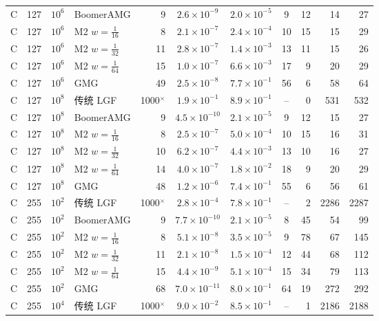 \begin{longtable}{lrrlrcccrrr}
C & 127 & $10^{6}$ & BoomerAMG & 9 & $2.6{\times}10^{-9}$ & $2.0{\times}10^{-5}$ & 9 & 12 & 14 & 27 \\
C & 127 & $10^{6}$ & M2 $w{=}\frac1{16}$ & 8 & $2.1{\times}10^{-7}$ & $2.4{\times}10^{-4}$ & 10 & 15 & 15 & 29 \\
C & 127 & $10^{6}$ & M2 $w{=}\frac1{32}$ & 11 & $2.8{\times}10^{-7}$ & $1.4{\times}10^{-3}$ & 13 & 11 & 15 & 26 \\
C & 127 & $10^{6}$ & M2 $w{=}\frac1{64}$ & 15 & $1.0{\times}10^{-7}$ & $6.6{\times}10^{-3}$ & 17 & 9 & 20 & 29 \\
C & 127 & $10^{6}$ & GMG & 49 & $2.5{\times}10^{-8}$ & $7.7{\times}10^{-1}$ & 56 & 6 & 58 & 64 \\
C & 127 & $10^{8}$ & 传统 LGF & 1000$^\times$ & $1.9{\times}10^{-1}$ & $8.9{\times}10^{-1}$ & -- & 0 & 531 & 532 \\
C & 127 & $10^{8}$ & BoomerAMG & 9 & $4.5{\times}10^{-10}$ & $2.1{\times}10^{-5}$ & 9 & 12 & 15 & 27 \\
C & 127 & $10^{8}$ & M2 $w{=}\frac1{16}$ & 8 & $2.5{\times}10^{-7}$ & $5.0{\times}10^{-4}$ & 10 & 15 & 16 & 31 \\
C & 127 & $10^{8}$ & M2 $w{=}\frac1{32}$ & 10 & $6.2{\times}10^{-7}$ & $4.4{\times}10^{-3}$ & 13 & 10 & 16 & 27 \\
C & 127 & $10^{8}$ & M2 $w{=}\frac1{64}$ & 14 & $4.0{\times}10^{-7}$ & $1.8{\times}10^{-2}$ & 18 & 9 & 20 & 29 \\
C & 127 & $10^{8}$ & GMG & 48 & $1.2{\times}10^{-6}$ & $7.4{\times}10^{-1}$ & 55 & 6 & 56 & 61 \\
C & 255 & $10^{2}$ & 传统 LGF & 1000$^\times$ & $2.8{\times}10^{-4}$ & $7.8{\times}10^{-1}$ & -- & 2 & 2286 & 2287 \\
C & 255 & $10^{2}$ & BoomerAMG & 9 & $7.7{\times}10^{-10}$ & $2.1{\times}10^{-5}$ & 8 & 45 & 54 & 99 \\
C & 255 & $10^{2}$ & M2 $w{=}\frac1{16}$ & 8 & $5.1{\times}10^{-8}$ & $3.5{\times}10^{-5}$ & 9 & 78 & 67 & 145 \\
C & 255 & $10^{2}$ & M2 $w{=}\frac1{32}$ & 11 & $2.1{\times}10^{-8}$ & $1.5{\times}10^{-4}$ & 12 & 44 & 68 & 112 \\
C & 255 & $10^{2}$ & M2 $w{=}\frac1{64}$ & 15 & $4.4{\times}10^{-9}$ & $5.1{\times}10^{-4}$ & 15 & 34 & 79 & 113 \\
C & 255 & $10^{2}$ & GMG & 68 & $7.0{\times}10^{-11}$ & $8.0{\times}10^{-1}$ & 64 & 19 & 272 & 292 \\
C & 255 & $10^{4}$ & 传统 LGF & 1000$^\times$ & $9.0{\times}10^{-2}$ & $8.5{\times}10^{-1}$ & -- & 1 & 2186 & 2188 \\

\end{longtable}

